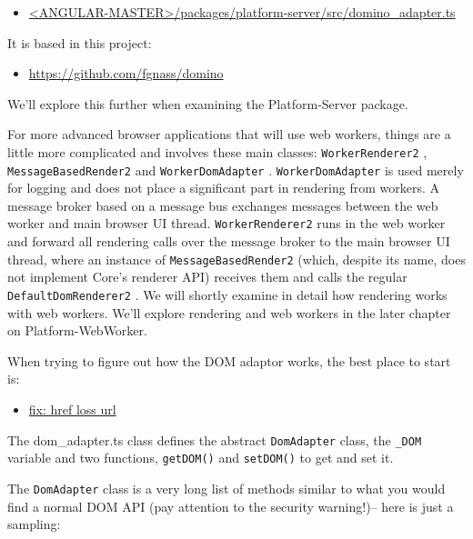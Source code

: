 \begin{itemize}
  \item \href{https://github.com/angular/angular/blob/master/packages/platform-server/src/domino_adapter.ts}
        {<ANGULAR-MASTER>/packages/platform-server/src/domino\_adapter.ts}
\end{itemize}

It is based in this project:

\begin{itemize}
  \item \url{https://github.com/fgnass/domino}
\end{itemize}

We’ll explore this further when examining the Platform-Server package.

For more advanced browser applications that will use web workers, things are a little
more complicated and involves these main classes:
\texttt{WorkerRenderer2}
,
\texttt{MessageBasedRender2}
and
\texttt{WorkerDomAdapter}
.
\texttt{WorkerDomAdapter}
is used merely for
logging and does not place a significant part in rendering from workers. A message
broker based on a message bus exchanges messages between the web worker and
main browser UI thread.
\texttt{WorkerRenderer2}
runs in the web worker and forward all
rendering calls over the message broker to the main browser UI thread, where an
instance of
\texttt{MessageBasedRender2}
(which, despite its name, does not implement
Core’s renderer API) receives them and calls the regular
\texttt{DefaultDomRenderer2}
. We
will shortly examine in detail how rendering works with web workers. We’ll explore
rendering and web workers in the later chapter on Platform-WebWorker.

When trying to figure out how the DOM adaptor works, the best place to start is:

\begin{itemize}
  \item \href{fix: href loss url}
        {fix: href loss url}
\end{itemize}

The dom\_adapter.ts class defines the abstract
\texttt{DomAdapter}
class, the
\texttt{\_DOM}
variable
and two functions,
\texttt{getDOM()}
and
\texttt{setDOM()}
to get and set it.



The
\texttt{DomAdapter}
class is a very long list of methods similar to what you would find a
normal DOM API (pay attention to the security warning!)– here is just a sampling:

